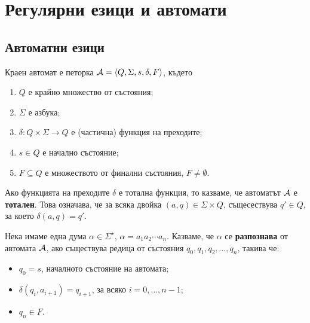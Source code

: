 \chapter{Регулярни езици и автомати}
\label{ch:regular}
\section{Автоматни езици}

\begin{dfn}
  Краен автомат е петорка $\mathcal{A} = \langle{Q,\Sigma,s,\delta,F}\rangle$, където
  \begin{enumerate}[1)]
  \item
    $Q$ е крайно множество от състояния;
  \item
    $\Sigma$ е азбука;
  \item
    $\delta:Q\times\Sigma\to Q$ е (частична) функция на преходите;
  \item
    $s\in Q$ е начално състояние;
  \item
    $F\subseteq Q$ е множеството от финални състояния, $F \neq \emptyset$.
  \end{enumerate}
\end{dfn}

Ако функцията на преходите $\delta$ е тотална функция, то казваме, 
че автоматът $\mathcal{A}$ е {\bf тотален}. Това означава, че за всяка двойка $(a,q) \in \Sigma\times Q$,
същесествува $q' \in Q$, за което $\delta(a,q) = q'$.

Нека имаме една дума $\alpha \in \Sigma^\star$, $\alpha = a_1a_2\cdots a_n$.
Казваме, че $\alpha$ се {\bf разпознава} от автомата $\mathcal{A}$, ако
съществува редица от състояния $q_0,q_1,q_2,\dots,q_n$, такива че:
\begin{itemize}
\item
  $q_0 = s$, началното състояние на автомата;
\item
  $\delta(q_i,a_{i+1}) = q_{i+1}$, за всяко $i = 0, \dots, n-1$;
\item
  $q_n \in F$.
\end{itemize}


